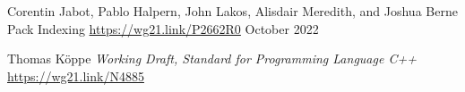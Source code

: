 \documentclass{wg21}
\begin{document}
\vspace{20mm}

\renewcommand{\section}[2]{}%



\begin{thebibliography}{9}

Corentin Jabot, Pablo Halpern, John Lakos, Alisdair Meredith, and Joshua Berne\newline
Pack Indexing\newline
\url{https://wg21.link/P2662R0}\newline
October 2022

Thomas Köppe
\emph{Working Draft, Standard for Programming Language C++}\newline
\url{https://wg21.link/N4885}


\end{thebibliography}
\end{document}
